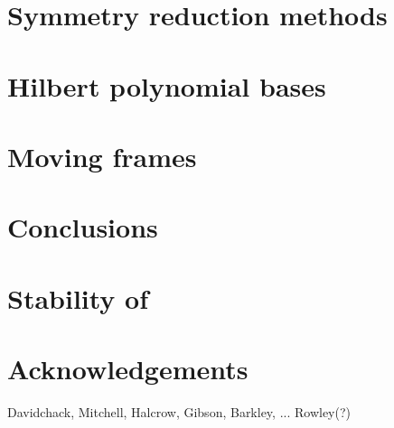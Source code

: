 \documentclass[aps,prl,preprint,superscriptaddress]{revtex4}
\begin{document}
\subsection{\label{s:introCLE} \CLe}
    

\section{\label{s:symRedGeneral} Symmetry reduction methods}
    

\section{\label{s:Hilbert} Hilbert polynomial bases}
    

\section{\label{sec:mf} Moving frames}
    
    
    
    


\section{Conclusions}
    

\appendix

\section{\label{s:StabReq} Stability of \reqva}
    

\section*{Acknowledgements}
 Davidchack, Mitchell, Halcrow, Gibson, Barkley, ... Rowley(?)





    
    
\end{document}
